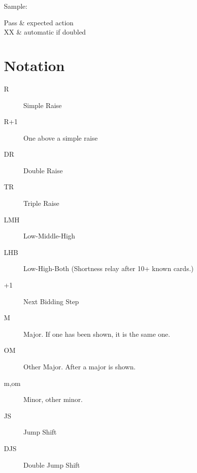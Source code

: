 \documentclass[tom-ari]{subfile}
\begin{document}
Sample:

\begin{bidtable}{}
	Pass & expected action \\
	XX & automatic if doubled \\
\end{bidtable}

\section{Notation}

\begin{description}
	\item[R] Simple Raise
	\item[R+1] One above a simple raise
	\item[DR] Double Raise
	\item[TR] Triple Raise
	\item[LMH] Low-Middle-High
	\item[LHB] Low-High-Both (Shortness relay after 10+ known cards.)
	\item[+1] Next Bidding Step
	\item[M] Major.  If one has been shown, it is the same one.
	\item[OM] Other Major.  After a major is shown.
	\item[m,om] Minor, other minor.
	\item[JS] Jump Shift
	\item[DJS] Double Jump Shift
\end{description}
\end{document}
